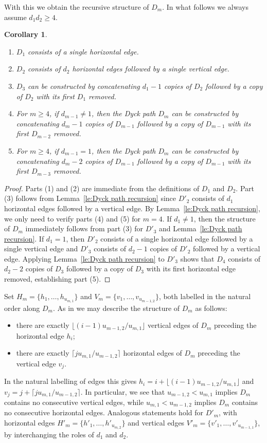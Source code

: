 \documentclass{amsart}
\newtheorem{corollary}[theorem]{Corollary}
\begin{document}
With this we obtain the recursive structure of $D_m$.  In what follows we always assume $d_1d_2\ge4$.
\begin{corollary}\mbox{}
  \begin{enumerate}
    \item $D_1$ consists of a single horizontal edge.
    \item $D_2$ consists of $d_2$ horizontal edges followed by a single vertical edge.
    \item $D_3$ can be constructed by concatenating $d_1-1$ copies of $D_2$ followed by a copy of $D_2$ with its first $D_1$ removed.
    \item For $m\ge4$, if $d_{m-1}\ne1$, then the Dyck path $D_m$ can be constructed by concatenating $d_m-1$ copies of $D_{m-1}$ followed by a copy of $D_{m-1}$ with its first $D_{m-2}$ removed.
    \item For $m\ge4$, if $d_{m-1}=1$, then the Dyck path $D_m$ can be constructed by concatenating $d_m-2$ copies of $D_{m-1}$ followed by a copy of $D_{m-1}$ with its first $D_{m-3}$ removed.
  \end{enumerate}
\end{corollary}
\begin{proof}
  Parts (1) and (2) are immediate from the definitions of $D_1$ and $D_2$.  Part (3) follows from Lemma~\ref{le:Dyck path recursion} since $D'_2$ consists of $d_1$ horizontal edges followed by a vertical edge.  By Lemma~\ref{le:Dyck path recursion}, we only need to verify parts (4) and (5) for $m=4$.  If $d_1\ne1$, then the structure of $D_m$ immediately follows from part (3) for $D'_3$ and Lemma~\ref{le:Dyck path recursion}.  If $d_1=1$, then $D'_2$ consists of a single horizontal edge followed by a single vertical edge and $D'_3$ consists of $d_2-1$ copies of $D'_2$ followed by a vertical edge.  Applying Lemma~\ref{le:Dyck path recursion} to $D'_3$ shows that $D_4$ consists of $d_2-2$ copies of $D_3$ followed by a copy of $D_3$ with its first horizontal edge removed, establishing part (5).
\end{proof}

Set $H_m=\{h_1,\ldots,h_{u_{m,1}}\}$ and $V_m=\{v_1,\ldots,v_{u_{m-1,2}}\}$, both labelled in the natural order along $D_m$.  
As in \cite[Lemma~3.2]{rupel2} we may describe the structure of $D_m$ as follows:
\begin{itemize}
  \item there are exactly $\lfloor (i-1)u_{m-1,2}/u_{m,1}\rfloor$ vertical edges of $D_m$ preceding the horizontal edge $h_i$;
  \item there are exactly $\lceil ju_{m,1}/u_{m-1,2}\rceil$ horizontal edges of $D_m$ preceding the vertical edge $v_j$.
\end{itemize}
In the natural labelling of edges this gives $h_i=i+\lfloor (i-1)u_{m-1,2}/u_{m,1}\rfloor$ and $v_j=j+\lceil ju_{m,1}/u_{m-1,2}\rceil$.  In particular, we see that $u_{m-1,2}<u_{m,1}$ implies $D_m$ contains no consecutive vertical edges, while $u_{m,1}<u_{m-1,2}$ implies $D_m$ contains no consecutive horizontal edges.  Analogous statements hold for $D'_m$, with horizontal edges $H'_m=\{h'_1,\ldots,h'_{u_{m,2}}\}$ and vertical edges $V'_m=\{v'_1,\ldots,v'_{u_{m-1,1}}\}$, by interchanging the roles of $d_1$ and $d_2$.
\end{document}
